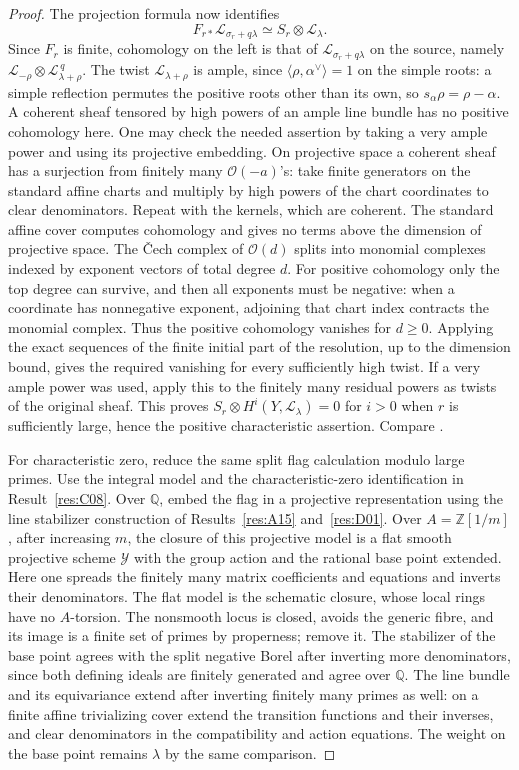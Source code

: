\documentclass[11pt,a4paper,openany,oneside]{book}
\theoremstyle{resultstyle}
\theoremstyle{definition}
\numberwithin{equation}{chapter}
\newcommand{\ZZ}{\mathbb{Z}}
\newcommand{\QQ}{\mathbb{Q}}
\begin{document}
\begin{proof}
The projection formula now identifies
\[
 F_{r*}\mathcal L_{\sigma_r+q\lambda}
 \simeq S_r\otimes\mathcal L_\lambda.
\]
Since \(F_r\) is finite, cohomology on the left is that of
\(\mathcal L_{\sigma_r+q\lambda}\) on the source, namely
\(\mathcal L_{-\rho}\otimes\mathcal L_{\lambda+\rho}^{\,q}\).
The twist \(\mathcal L_{\lambda+\rho}\) is ample, since
\(\langle\rho,\alpha^\vee\rangle=1\) on the simple roots:
a simple reflection permutes the positive roots other than its
own, so \(s_\alpha\rho=\rho-\alpha\).
A coherent sheaf tensored by high powers of an ample line
bundle has no positive cohomology here. One may check the
needed assertion by taking a very ample power and using
its projective embedding. On projective space a coherent
sheaf has a surjection from finitely many \(\mathcal O(-a)\)'s:
take finite generators on the standard affine charts and
multiply by high powers of the chart coordinates to clear
denominators. Repeat with the kernels, which are coherent.
The standard affine cover computes cohomology and gives no
terms above the dimension of projective space. The Čech
complex of \(\mathcal O(d)\) splits into monomial complexes
indexed by exponent vectors of total degree \(d\). For
positive cohomology only the top degree can survive, and
then all exponents must be negative: when a coordinate has
nonnegative exponent, adjoining that chart index contracts
the monomial complex. Thus the positive cohomology
vanishes for \(d\ge0\).
Applying the exact sequences of the finite initial part
of the resolution, up to the dimension bound, gives the
required vanishing for every sufficiently high twist.
If a very ample power was used, apply this to the finitely
many residual powers as twists of the original sheaf.
This proves
\(S_r\otimes H^i(Y,\mathcal L_\lambda)=0\) for \(i>0\)
when \(r\) is sufficiently large, hence the positive
characteristic assertion. Compare \cite[Theorems 2.1
and 3.1]{haboush}.

For characteristic zero, reduce the same split flag
calculation modulo large primes. Use the integral model and
the characteristic-zero identification in Result~\ref{res:C08}.
Over \(\QQ\), embed the
flag in a projective representation using the line
stabilizer construction of Results~\ref{res:A15}
and~\ref{res:D01}. Over \(A=\ZZ[1/m]\), after increasing
\(m\), the closure of this projective model is a flat
smooth projective scheme \(\mathcal Y\) with the group
action and the rational base point extended.
Here one spreads the finitely many matrix coefficients
and equations and inverts their denominators. The flat
model is the schematic closure, whose local rings have
no \(A\)-torsion. The nonsmooth locus is closed, avoids
the generic fibre, and its image is a finite set of
primes by properness; remove it. The stabilizer of the
base point agrees with the split negative Borel after
inverting more denominators, since both defining ideals
are finitely generated and agree over \(\QQ\).
The line bundle and its equivariance extend after
inverting finitely many primes as well: on a finite
affine trivializing cover extend the transition functions
and their inverses, and clear denominators in the
compatibility and action equations. The weight on the
base point remains \(\lambda\) by the same comparison.


\end{proof}
\end{document}
